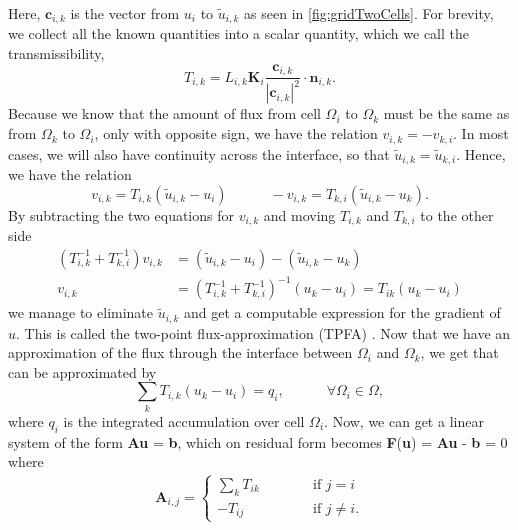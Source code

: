 Here, $\textbf{c}_{i,k}$ is the vector from $u_i$ to $\tilde{u}_{i,k}$ as seen in \autoref{fig:gridTwoCells}.  For brevity, we collect all the known quantities into a scalar quantity, which we call the transmissibility,
\begin{equation}
    T_{i,k} = L_{i,k}\textbf{K}_i\frac{\textbf{c}_{i,k}}{|\textbf{c}_{i,k}|^2} \cdot \textbf{n}_{i,k}.
    \label{eq:transmissibility}
\end{equation}
Because we know that the amount of flux from cell $\Omega_i$ to $\Omega_k$ must be the same as from $\Omega_k$ to $\Omega_i$, only with opposite sign, we have the relation $v_{i,k} = -v_{k,i}$.  In most cases, we will also have continuity across the interface, so that $\tilde{u}_{i,k} = \tilde{u}_{k,i}$. Hence, we have the relation 
\begin{equation*}
    v_{i,k} = T_{i,k}(\tilde{u}_{i,k} - u_i) \hspace{3em} -v_{i,k} = T_{k,i}(\tilde{u}_{i,k} - u_k).
\end{equation*}
By subtracting the two equations for $v_{i,k}$ and moving $T_{i,k}$ and $T_{k,i}$ to the other side 
\begin{equation}
    \begin{aligned}
        (T_{i,k}^{-1} + T_{k,i}^{-1}) v_{i,k} &= (\tilde{u}_{i,k} - u_i) - (\tilde{u}_{i,k} - u_k)
        \\
        v_{i,k} &= (T_{i,k}^{-1} + T_{k,i}^{-1})^{-1}(u_k - u_i) = T_{ik}(u_k - u_i)
    \end{aligned}
    \label{eq:flux}
\end{equation}
we manage to eliminate $\tilde{u}_{i,k}$ and get a computable expression for the gradient of $u$. This is called the two-point flux-approximation (TPFA) \citep{lieMrstUrl}. Now that we have an approximation of the flux through the interface between $\Omega_i$ and $\Omega_k$, we get that  can be approximated by 
\begin{equation}
    \sum_k T_{i,k}(u_k - u_i) = q_i, \hspace{3em} \forall \Omega_i \in \Omega,
    \label{eq:PoissonSolvableTwoCells}
\end{equation}
where $q_i$ is the integrated accumulation over cell $\Omega_i$. Now, we can get a linear system of the form \textbf{A}\textbf{u} = \textbf{b},  which on residual form becomes \textbf{F}(\textbf{u}) = \textbf{A}\textbf{u} - \textbf{b} = 0 where
\begin{align*}
    \textbf{A}_{i,j} = 
    \left\lbrace
    \begin{array}{lr}
    \sum_k T_{ik} \hspace{3em}&\text{if } j = i\\
    -T_{ij} \hspace{3em}&\text{if } j \neq i.
    \end{array}
    \right.
\end{align*}
